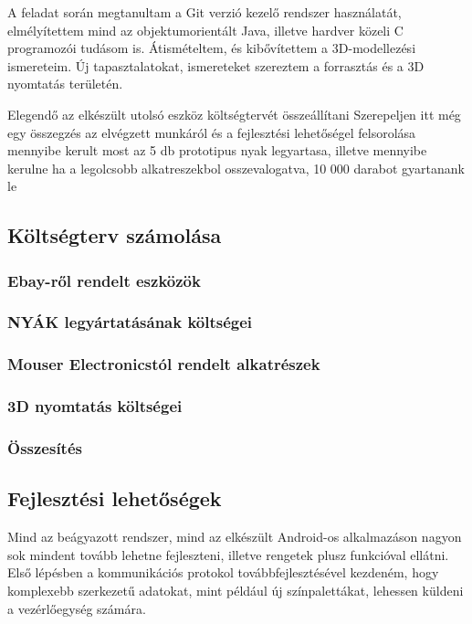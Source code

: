 \documentclass[../main.tex]{subfiles}
\begin{document}
        A feladat során megtanultam a Git verzió kezelő rendszer használatát, elmélyítettem mind az objektumorientált Java, illetve hardver közeli C programozói tudásom is. Átismételtem, és kibővítettem a 3D-modellezési ismereteim. Új tapasztalatokat, ismereteket szereztem a forrasztás és a 3D nyomtatás területén. 
    
    

Elegendő az elkészült utolsó eszköz költségtervét összeállítani
Szerepeljen itt még egy összegzés az elvégzett munkáról és a fejlesztési lehetőségel felsorolása
    mennyibe kerult most az 5 db prototipus nyak legyartasa, illetve mennyibe kerulne ha a legolcsobb alkatreszekbol osszevalogatva, 10 000 darabot gyartanank le
    
    \subsection{Költségterv számolása}
        \subsubsection{Ebay-ről rendelt eszközök}
        \subsubsection{NYÁK legyártatásának költségei}
        \subsubsection{Mouser Electronicstól rendelt alkatrészek}
        \subsubsection{3D nyomtatás költségei}
        
        \subsubsection{Összesítés}
            
        
    
    \subsection{Fejlesztési lehetőségek}
        Mind az beágyazott rendszer, mind az elkészült Android-os alkalmazáson nagyon sok mindent tovább lehetne fejleszteni, illetve rengetek plusz funkcióval ellátni. Első lépésben a kommunikációs protokol továbbfejlesztésével kezdeném, hogy komplexebb szerkezetű adatokat, mint például új színpalettákat, lehessen küldeni a vezérlőegység számára.
        
\end{document}
